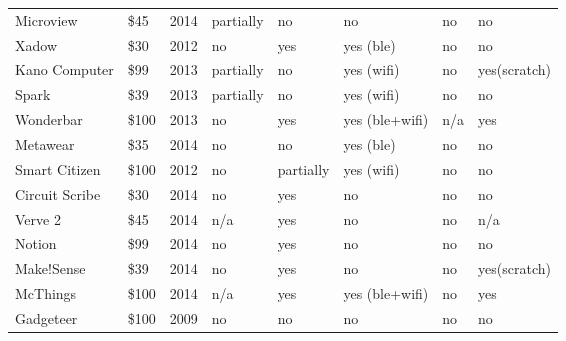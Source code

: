 \begin{landscape}
\begin{longtable}{P{2cm}P{1cm}P{1cm}P{1.5cm}P{1.5cm}P{1.5cm}P{.51cm}P{.51cm}}
	    Microview                          & \$45        & 2014         & partially   & no               & no                     & no      & no                       \\
	    Xadow                              & \$30        & 2012         & no          & yes              & yes (ble)              & no      & no                      \\
	    Kano Computer                      & \$99        & 2013         & partially   & no               & yes (wifi)             & no      & yes\newline (scratch)                     \\
	    Spark                              & \$39       & 2013         & partially   & no               & yes (wifi)             & no      & no                 \\
	    Wonderbar                          & \$100 & 2013         & no          & yes              & yes (ble+wifi)         & n/a     & yes              \\
	    Metawear                           & \$35   & 2014         & no          & no               & yes (ble)              & no      & no                         \\
	    Smart Citizen                      & \$100  & 2012         & no          & partially        & yes (wifi)             & no      & no                                \\
	    Circuit Scribe                     & \$30   & 2014         & no          & yes              & no                     & no      & no                                \\
	    Verve 2                            & \$45   & 2014         & n/a         & yes              & no                     & no      & n/a                               \\
	    Notion							   & \$99        & 2014         & no          & yes              & no                     & no      & no             \\
	    Make!Sense                         & \$39        & 2014         & no          & yes              & no                     & no      & yes\newline (scratch)                     \\
	    McThings                           & \$100       & 2014         & n/a         & yes              & yes (ble+wifi)         & no      & yes            \\
	    Gadgeteer                          & \$100   & 2009         & no          & no               & no                     & no      & no                                \\

\end{longtable}
\end{landscape}
